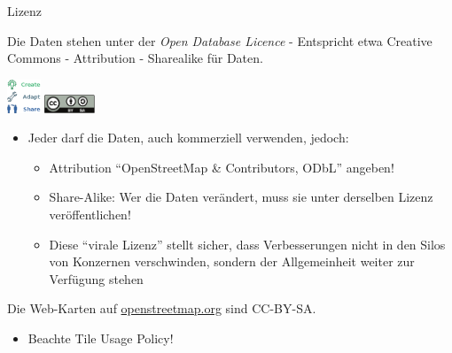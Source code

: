 \documentclass{beamer}
\begin{document}
\begin{frame}{Lizenz}

  Die Daten stehen unter der \emph{Open Database Licence} - Entspricht etwa Creative Commons - Attribution - Sharealike für Daten.

 \begin{center}
 \includegraphics[width=1cm]{ODbL.png}
 \hspace{2cm}
 \includegraphics[width=1.5cm]{cc-by-sa.pdf}
 \end{center}

\pause

\vspace*{-0.3cm}

\begin{itemize}
  \item Jeder darf die Daten, auch kommerziell verwenden, jedoch:
  \begin{itemize}
    \item Attribution "`OpenStreetMap \& Contributors, ODbL"' angeben!
    \item Share-Alike: Wer die Daten verändert, muss sie unter derselben Lizenz veröffentlichen!
    \item Diese "`virale Lizenz"' stellt sicher, dass Verbesserungen nicht in den Silos von Konzernen verschwinden, sondern der Allgemeinheit weiter zur Verfügung stehen
  \end{itemize}

\end{itemize}


\pause
Die Web-Karten auf \href{http://osm.org}{openstreetmap.org} sind CC-BY-SA.
\begin{itemize}
  \item Beachte Tile Usage Policy!
\end{itemize}


\end{frame}
\end{document}
